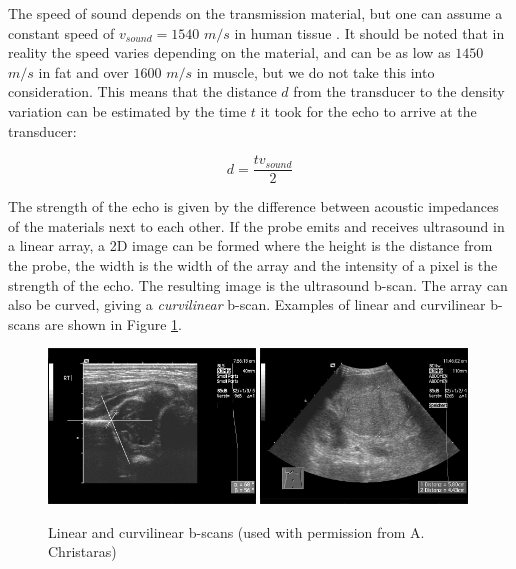 The speed of sound depends on the transmission material, but one can assume a constant speed of $v_{sound} = 1540$ $m/s$ in human tissue \cite{anderson2000}. It should be noted that in reality the speed varies depending on the material, and can be as low as $1450$ $m/s$ in fat and over $1600$ $m/s$ in muscle, but we do not take this into consideration. This means that the distance $d$ from the transducer to the density variation can be estimated by the time $t$ it took for the echo to arrive at the transducer:

	\begin{equation}
		d = \frac{tv_{sound}}{2}
		\label{eq:ultrasound_distance}
	\end{equation}
	
The strength of the echo is given by the difference between acoustic impedances of the materials next to each other. If the probe emits and receives ultrasound in a linear array, a 2D image can be formed where the height is the distance from the probe, the width is the width of the array and the intensity of a pixel is the strength of the echo. The resulting image is the ultrasound b-scan. The array can also be curved, giving a \emph{curvilinear} b-scan. Examples of linear and curvilinear b-scans are shown in Figure \ref{fig:b-scan_examples}.

	\begin{figure}[h]
	\centering
	\includegraphics[width=0.49\textwidth]{graphics/linear_b-scan.png}
	\includegraphics[width=0.49\textwidth]{graphics/curvilinear_b-scan.png}
	\caption[Linear and curvilinear b-scans]{Linear and curvilinear b-scans (used with permission from A. Christaras)}
	\label{fig:b-scan_examples}
	\end{figure}


